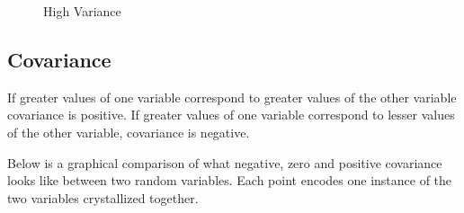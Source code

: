 \documentclass[12pt]{report}
\begin{document}
\begin{figure}[H]
\begin{minipage}{0.45\textwidth}
                        High Variance
                        \label{fig:high_variance}
                    \end{minipage}%
                \end{figure}


            
            \subsection{Covariance}

                If greater values of one variable correspond to greater values of the other variable covariance is positive. If greater values of one variable correspond to lesser values of the other variable, covariance is negative.

                Below is a graphical comparison of what negative, zero and positive covariance looks like between two random variables. Each point encodes one instance of the two variables crystallized together.
\end{document}

